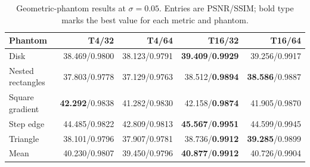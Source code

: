 \begin{table}[htbp]
\centering
\caption{Geometric-phantom results at $\sigma=0.05$. Entries are PSNR/SSIM; bold type marks the best value for each metric and phantom.}
\label{tab:geometric_phantoms}
\begin{tabular}{lrrrr}
\toprule
Phantom & T4/32 & T4/64 & T16/32 & T16/64 \\
\midrule
Disk & 38.469/0.9800 & 38.123/0.9791 & \textbf{39.409}/\textbf{0.9929} & 39.256/0.9917 \\
Nested rectangles & 37.803/0.9778 & 37.129/0.9763 & 38.512/\textbf{0.9894} & \textbf{38.586}/0.9887 \\
Square gradient & \textbf{42.292}/0.9838 & 41.282/0.9830 & 42.158/\textbf{0.9874} & 41.905/0.9870 \\
Step edge & 44.485/0.9822 & 42.809/0.9813 & \textbf{45.567}/\textbf{0.9951} & 44.599/0.9945 \\
Triangle & 38.101/0.9796 & 37.907/0.9781 & 38.736/\textbf{0.9912} & \textbf{39.285}/0.9899 \\
Mean & 40.230/0.9807 & 39.450/0.9796 & \textbf{40.877}/\textbf{0.9912} & 40.726/0.9904 \\
\bottomrule
\end{tabular}
\end{table}
